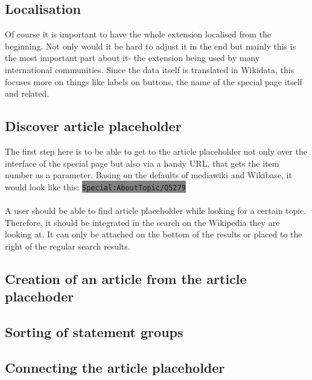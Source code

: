 \documentclass[11pt]{article}
\begin{document}
\subsection{Localisation}
Of course it is important to have the whole extension localised from the beginning. Not only would it be hard to adjust it in the end but mainly this is the most important part about it- the extension being used by many international communities. Since the data itself is translated in Wikidata, this focuses more on things like labels on buttons, the name of the special page itself and related. \\
\subsection{Discover article placeholder}
The first step here is to be able to get to the article placeholder not only over the interface of the special page but also via a handy URL, that gets the item number as a parameter. Basing on the defaults of mediawiki and Wikibase, it would look like this: \colorbox{Gray}{\lstinline[basicstyle=\ttfamily\color{white}]|Special:AboutTopic/Q5279|} \\
\\
A user should be able to find article placeholder while looking for a certain topic. Therefore, it should be integrated in the search on the Wikipedia they are looking at. It can only be attached on the bottom of the results or placed to the right of the regular search results. %
%

\subsection{Creation of an article from the article placehoder}
%

\subsection{Sorting of statement groups}

%

\subsection{ Connecting the article placeholder }
%
\end{document}
